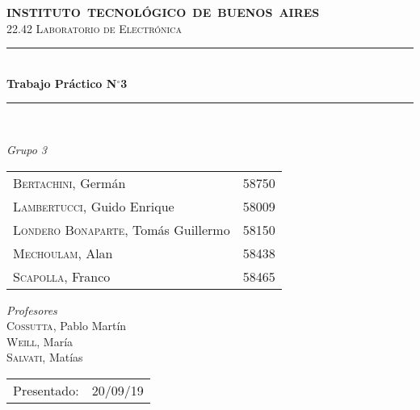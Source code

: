 \begin{titlepage}

\newcommand{\HRule}{\rule{\linewidth}{0.5mm}}
\center
\mbox{\textsc{\large \bfseries {INSTITUTO TECNOLÓGICO DE BUENOS AIRES}}}\\[1cm]
\textsc{\Large 22.42 Laboratorio de Electrónica}\\[0.5cm]


\HRule \\[0.6cm]
{ \Huge \bfseries Trabajo Práctico N$^{\circ}$3}\\[0.4cm] 
\HRule \\[1.5cm]


{\large

\emph{Grupo 3}\\
\vspace{3px}

\begin{tabular}{lr} 	
\textsc{Bertachini}, Germán  & 58750 \\ 	
\textsc{Lambertucci}, Guido Enrique  & 58009 \\
\textsc{Londero Bonaparte}, Tomás Guillermo  & 58150 \\
\textsc{Mechoulam}, Alan  &  58438\\
\textsc{Scapolla}, Franco & 58465
\end{tabular}

\vspace{20px}

\emph{Profesores}\\
\vspace{3px}
\textsc{Cossutta}, Pablo Martín\\
\textsc{Weill}, María\\
\textsc{Salvati}, Matías\\	
\vspace{100px}

\begin{tabular}{ll}

Presentado: & 20/09/19\\

\end{tabular}

}

\vfill

\end{titlepage}

